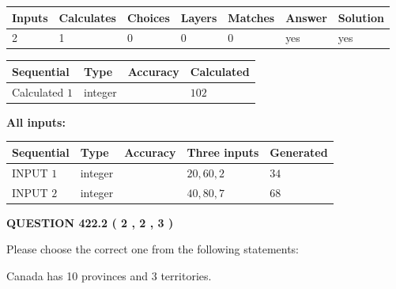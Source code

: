 \documentclass[12pt]{article}
\begin{document}
 

 
   
   
   
   
\noindent\begin{tabular}{|l|l|l|l|l|l|l|}
 \hline
Inputs & Calculates & Choices & Layers & Matches & Answer & Solution \\ \hline
 2  & 
 1  & 
 0
  & 
 0  & 
 0  & 
  yes & 
  yes 
  \\ \hline
 \end{tabular}
   
   
   
   
\noindent{}
   
   
  
  
\noindent\begin{tabular}{|l|l|l|l|}
\hline
 Sequential & Type & Accuracy & Calculated \\ 
\hline
 
 
  Calculated $  1 $ & integer &  & 
  $ 102 $ 
 \\  \hline  
 \end{tabular}
   
   
   
   
\noindent\vspace{0.1in}\hspace{-0.08in} {\textbf{\Large{All inputs: }}}
   
   
  
  
\noindent\begin{tabular}{|l|l|l|l|l|}
\hline
 Sequential & Type & Accuracy & Three inputs & Generated \\ 
\hline
 
 
  INPUT $  1 $ & integer &  & $
 20
 , 
 60
 , 
 2
 $ & $ 34 $ 
 \\  \hline  
 
 
  INPUT $  2 $ & integer &  & $
 40
 , 
 80
 , 
 7
 $ & $ 68 $ 
 \\  \hline  
 \end{tabular}
   
   
  
\vspace{0.2in}
  
{\textbf{\Large{QUESTION
422.2 
 ( 2 , 2 , 3 )
}}}
  
  
Please choose the correct one from the following statements:
 
 
Canada has 10  provinces and 3 territories.
 
\end{document}

